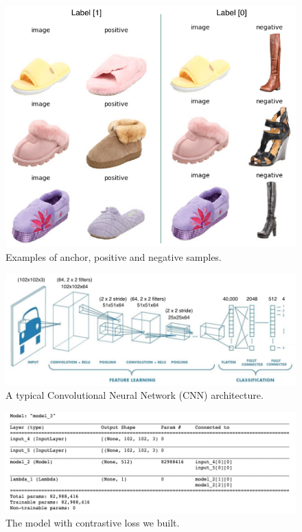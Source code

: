 \begin{figure}[h]
  \centering
  \includegraphics[width=0.9\linewidth]{figs/pairs.png}
  \caption{Examples of anchor, positive and negative samples.}
  \label{fig:pairs}
\end{figure}


\begin{figure}[h]
 \centering
 \includegraphics[width=\linewidth]{figs/cnn.png}
 \caption{A typical Convolutional Neural Network (CNN) architecture.}
 \label{fig:cnn}
\end{figure}

\begin{figure}[h]
  \centering
  \includegraphics[width=\linewidth]{figs/contra_model.png}
  \caption{The model with contrastive loss we built.}
  \label{fig:contra_model}
\end{figure}





